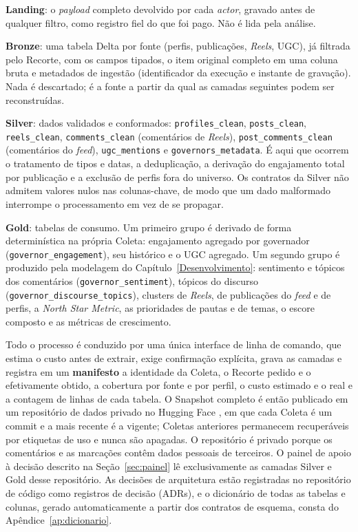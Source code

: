 \begin{alineas}
    \item \textbf{Landing}: o \emph{payload} completo devolvido por cada \emph{actor}, gravado antes de qualquer filtro, como registro fiel do que foi pago. Não é lida pela análise.
    \item \textbf{Bronze}: uma tabela Delta por fonte (perfis, publicações, \emph{Reels}, UGC), já filtrada pelo Recorte, com os campos tipados, o item original completo em uma coluna bruta e metadados de ingestão (identificador da execução e instante de gravação). Nada é descartado; é a fonte a partir da qual as camadas seguintes podem ser reconstruídas.
    \item \textbf{Silver}: dados validados e conformados: \texttt{profiles\_\allowbreak{}clean}, \texttt{posts\_\allowbreak{}clean}, \texttt{reels\_\allowbreak{}clean}, \texttt{comments\_\allowbreak{}clean} (comentários de \emph{Reels}), \texttt{post\_\allowbreak{}comments\_\allowbreak{}clean} (comentários do \emph{feed}), \texttt{ugc\_\allowbreak{}mentions} e \texttt{governors\_\allowbreak{}metadata}. É aqui que ocorrem o tratamento de tipos e datas, a deduplicação, a derivação do engajamento total por publicação e a exclusão de perfis fora do universo. Os contratos da Silver não admitem valores nulos nas colunas-chave, de modo que um dado malformado interrompe o processamento em vez de se propagar.
    \item \textbf{Gold}: tabelas de consumo. Um primeiro grupo é derivado de forma determinística na própria Coleta: engajamento agregado por governador (\texttt{governor\_\allowbreak{}engagement}), seu histórico e o UGC agregado. Um segundo grupo é produzido pela modelagem do Capítulo~\ref{Desenvolvimento}: sentimento e tópicos dos comentários (\texttt{governor\_\allowbreak{}sentiment}), tópicos do discurso (\texttt{governor\_\allowbreak{}discourse\_\allowbreak{}topics}), clusters de \emph{Reels}, de publicações do \emph{feed} e de perfis, a \emph{North Star Metric}, as prioridades de pautas e de temas, o escore composto e as métricas de crescimento.
\end{alineas}

Todo o processo é conduzido por uma única interface de linha de comando, que estima o custo antes de extrair, exige confirmação explícita, grava as camadas e registra em um \textbf{manifesto} a identidade da Coleta, o Recorte pedido e o efetivamente obtido, a cobertura por fonte e por perfil, o custo estimado e o real e a contagem de linhas de cada tabela. O Snapshot completo é então publicado em um repositório de dados privado no Hugging Face \cite{huggingface2026}, em que cada Coleta é um commit e a mais recente é a vigente; Coletas anteriores permanecem recuperáveis por etiquetas de uso e nunca são apagadas. O repositório é privado porque os comentários e as marcações contêm dados pessoais de terceiros. O painel de apoio à decisão descrito na Seção~\ref{sec:painel} lê exclusivamente as camadas Silver e Gold desse repositório. As decisões de arquitetura estão registradas no repositório de código como registros de decisão (ADRs), e o dicionário de todas as tabelas e colunas, gerado automaticamente a partir dos contratos de esquema, consta do Apêndice~\ref{ap:dicionario}.

